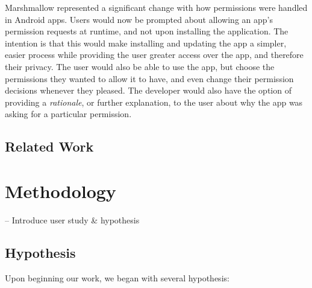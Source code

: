 \documentclass{sig-alternate-05-2015}
\begin{document}
Marshmallow represented a significant change with how permissions were handled in Android apps. Users would now be prompted about allowing an app's permission requests at runtime, and not upon installing the application. The intention is that this would make installing and updating the app a simpler, easier process while providing the user greater access over the app, and therefore their privacy. The user would also be able to use the app, but choose the permissions they wanted to allow it to have, and even change their permission decisions whenever they pleased. The developer would also have the option of providing a \emph{rationale}, or further explanation, to the user about why the app was asking for a particular permission.





\subsection{Related Work}




\section{Methodology} %
\label{sec: method}

-- Introduce user study \& hypothesis


% 


\subsection{Hypothesis}

Upon beginning our work, we began with several hypothesis:
\end{document}
